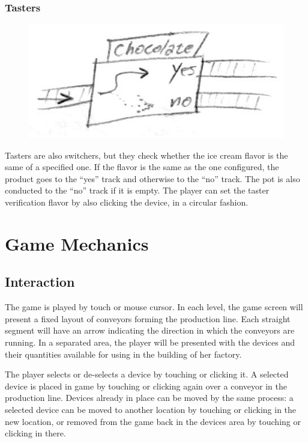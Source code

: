 \documentclass[a4paper]{scrartcl}
\begin{document}
        \subsubsection{Tasters}
            \begin{minipage}[t][5em][t]{\textwidth}
                \begin{figure}
                    \vspace{-20pt}
                    \includegraphics[scale=1]{devices/taster}
                    \vspace{-20pt}
                \end{figure}

                Tasters are also switchers, but they check whether the ice cream flavor is the same of a specified one. If the flavor is the same as the one configured, the product goes to the ``yes'' track and otherwise to the ``no'' track. The pot is also conducted to the ``no'' track if it is empty. The player can set the taster verification flavor by also clicking the device, in a circular fashion.
            \end{minipage}

\section{Game Mechanics}

	\subsection{Interaction}
		The game is played by touch or mouse cursor. In each level, the game screen will present a fixed layout of conveyors forming the production line. Each straight segment will have an arrow indicating the direction in which the conveyors are running. In a separated area, the player will be presented with the devices and their quantities available for using in the building of her factory.
		
		The player selects or de-selects a device by touching or clicking it. A selected device is placed in game by touching or clicking again over a conveyor in the production line. Devices already in place can be moved by the same process: a selected device can be moved to another location by touching or clicking in the new location, or removed from the game back in the devices area by touching or clicking in there.
		
\end{document}
